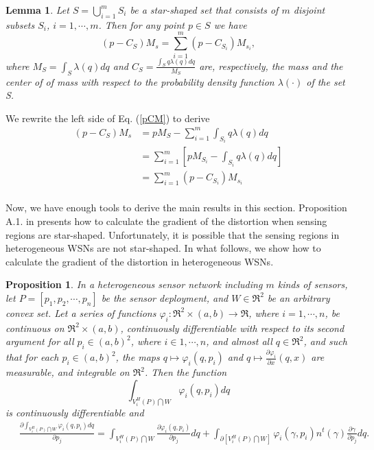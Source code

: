 \documentclass[journal,draftcls,onecolumn,12pt,twoside, narroweqnarray]{IEEEtran}
\newtheorem{prop}{Proposition}
\newtheorem{Lemma}{Lemma}
\begin{document}
\begin{Lemma}
\label{Lamma3}
Let $S=\bigcup_{i=1}^mS_i$ be a star-shaped set that consists of $m$ disjoint subsets $S_i$, $i=1,\cdots,m$. Then for any point $p\in S$ we have
\begin{equation}
(p-C_S)M_s=\sum_{i=1}^{m}(p-C_{S_i})M_{s_i},\label{pCM}
\end{equation}
where $M_S=\int_S\lambda(q)dq$ and $C_S=\frac{\int_Sq\lambda(q)dq}{M_S}$ are, respectively, the mass and the center of of mass with respect to the probability density function $\lambda(\cdot)$ of the set S.
\end{Lemma}
\begin{IEEEproof}
We rewrite the left side of Eq. (\ref{pCM}) to derive
\begin{equation}
\begin{aligned}
(p-C_S)M_s
&{=}pM_S-\sum_{i=1}^{m}\int_{S_i}q\lambda(q)dq\\
&{=}\sum_{i=1}^{m}\left[pM_{S_i}-\int_{S_i}q\lambda(q)dq\right]\\
&{=}\sum_{i=1}^{m}(p-C_{S_i})M_{s_i}\\
\end{aligned}
\end{equation}
\end{IEEEproof}
Now, we have enough tools to derive the main results in this section.
Proposition A.1. in \cite{SD} presents how to calculate the gradient of the distortion when sensing regions are star-shaped. Unfortunately, it is possible that the sensing regions in heterogeneous WSNs are not star-shaped. In what follows, we show how to calculate the gradient of the distortion in heterogeneous WSNs.
\begin{prop}
\label{prop2}
In a heterogeneous sensor network including $m$ kinds of sensors, let $P=\left[p_1,p_2,\cdots,p_n\right]$ be the sensor deployment, and $W\in\Re^2$ be an arbitrary convex set. Let a series of functions $\varphi_i:\Re^2\times(a,b)\to \Re$, where $i=1,\cdots,n$, be continuous on $\Re^2\times(a,b)$, continuously differentiable with respect to its second argument for all $p_i\in(a,b)^2$, where $i\in{1,\cdots,n}$, and almost all $q\in\Re^2$, and such that for each $p_i\in(a,b)^2$, the maps $q\mapsto \varphi_i(q,p_i)$ and $q\mapsto \frac{\partial \varphi_i}{\partial x}(q,x)$ are measurable, and integrable on $\Re^2$. Then the function
\begin{equation}
\int_{V^H_i(P)\bigcap W}\varphi_i(q,p_i)dq
\end{equation}
is continuously differentiable and
\begin{equation}
\begin{aligned}
\label{EQ1}
&\:\frac{\partial \int_{V^H_i(P)\bigcap W}\varphi_i(q,p_i)dq}{\partial p_j} = \int_{V^H_i(P)\bigcap W}\frac{\partial \varphi_i(q,p_i)}{\partial p_j}dq + \int_{\partial\left[V^H_i(P)\bigcap W\right]}\varphi_i(\gamma,p_i)n^t(\gamma)\frac{\partial\gamma}{\partial p_j}dq.
\end{aligned}
\end{equation}
\end{prop}
\end{document}
